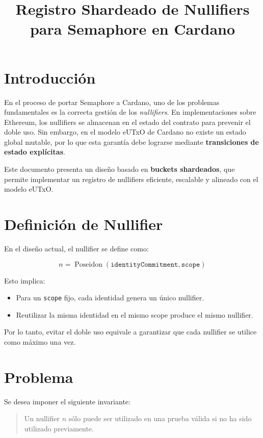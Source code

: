 \documentclass[11pt]{article}
\title{Registro Shardeado de Nullifiers para Semaphore en Cardano}
\author{}
\date{}
\begin{document}
	
	\maketitle
	
	\section{Introducción}
	
	En el proceso de portar Semaphore a Cardano, uno de los problemas fundamentales es la correcta gestión de los \textit{nullifiers}. En implementaciones sobre Ethereum, los nullifiers se almacenan en el estado del contrato para prevenir el doble uso. Sin embargo, en el modelo eUTxO de Cardano no existe un estado global mutable, por lo que esta garantía debe lograrse mediante \textbf{transiciones de estado explícitas}.
	
	Este documento presenta un diseño basado en \textbf{buckets shardeados}, que permite implementar un registro de nullifiers eficiente, escalable y alineado con el modelo eUTxO.
	
	\section{Definición de Nullifier}
	
	En el diseño actual, el nullifier se define como:
	
	$$n = \operatorname{Poseidon}(\texttt{identityCommitment}, \texttt{scope})$$
	
	Esto implica:
	
	\begin{itemize}
		\item Para un \texttt{scope} fijo, cada identidad genera un único nullifier.
		\item Reutilizar la misma identidad en el mismo scope produce el mismo nullifier.
	\end{itemize}
	
	Por lo tanto, evitar el doble uso equivale a garantizar que cada nullifier se utilice como máximo una vez.
	
	\section{Problema}
	
	Se desea imponer el siguiente invariante:
	
	\begin{quote}
		Un nullifier $n$ sólo puede ser utilizado en una prueba válida si no ha sido utilizado previamente.
	\end{quote}
	
\end{document}
